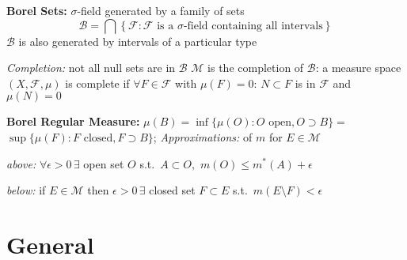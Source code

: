 \documentclass[8pt,twoside]{extarticle}
\begin{document}
\begin{multicols}{2}
\textbf{Borel Sets:} $\sigma$-field generated by a family of sets
$$\mathcal{B} =\bigcap \left\{\mathcal{F}:\mathcal{F} \text{ is a } \sigma\text{-field containing all intervals}\right\}$$
$\mathcal{B}$ is also generated by intervals of a particular type

\textit{Completion:} not all null sets are in $\mathcal{B}$ \newline
$\mathcal{M}$ is the completion of $\mathcal{B}$: a measure space $(X,\mathcal{F},\mu)$ is complete if $\forall F\in\mathcal{F}$ with $\mu(F)=0$: $N\subset F$ is in $\mathcal{F}$ and $\mu(N)=0$

\textbf{Borel Regular Measure:} $\mu(B)=\inf\{\mu(O): O \text{ open}, O\supset B\}{=}$ $\sup\{\mu(F): F \text{ closed}, F \supset B\}$;
\textit{Approximations:} of $m$ for $E\in \mathcal{M}$

\textit{above:}  
$\forall \epsilon>0\,\exists$ open set $O$ s.t.\ $A\subset O,$ $m(O)\leq m^*(A)+\epsilon$

\textit{below:} if $E \in \mathcal{M}$ then $\epsilon>0\, \exists$ closed set $F\subset E$ s.t.\ $m(E\setminus F)<\epsilon$


\end{multicols}













\section{General}
\end{document}
